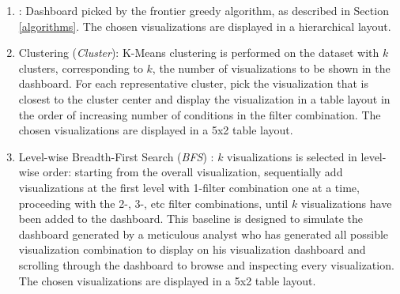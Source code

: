 \begin{enumerate}
	\item \system: Dashboard picked by the frontier greedy algorithm, as described in Section \ref{algorithms}. The chosen visualizations are displayed in a hierarchical layout.
	\item Clustering (\textit{Cluster}): K-Means clustering is performed on the dataset with $k$ clusters, corresponding to $k$, the number of visualizations to be shown in the dashboard. For each representative cluster, pick the visualization that is closest to the cluster center and display the visualization in a table layout in the order of increasing number of conditions in the filter combination. The chosen visualizations are displayed in a 5x2 table layout.
	\item Level-wise Breadth-First Search (\textit{BFS}) : $k$ visualizations is selected in level-wise order: starting from the overall visualization, sequentially add visualizations at the first level with 1-filter combination one at a time, proceeding with the 2-, 3-, etc filter combinations, until $k$ visualizations have been added to the dashboard. This baseline is designed to simulate the dashboard generated by a meticulous analyst who has generated all possible visualization combination to display on his visualization dashboard and scrolling through the dashboard to browse and inspecting every visualization. The chosen visualizations are displayed in a 5x2 table layout.
\end{enumerate}
